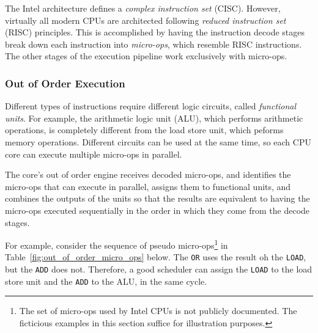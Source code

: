 
The Intel architecture defines a \textit{complex instruction set} (CISC).
However, virtually all modern CPUs are architected following \textit{reduced
instruction set} (RISC) principles. This is accomplished by having the
instruction decode stages break down each instruction into \textit{micro-ops},
which resemble RISC instructions. The other stages of the execution pipeline
work exclusively with micro-ops.


\subsubsection{Out of Order Execution}


Different types of instructions require different logic circuits, called
\textit{functional units}. For example, the arithmetic logic unit (ALU), which
performs arithmetic operations, is completely different from the load store
unit, which peforms memory operations. Different circuits can be used at the
same time, so each CPU core can execute multiple micro-ops in parallel.

The core's out of order engine receives decoded micro-ops, and identifies the
micro-ops that can execute in parallel, assigns them to functional units, and
combines the outputs of the units so that the results are equivalent to having
the micro-ops executed sequentially in the order in which they come from the
decode stages.

For example, consider the sequence of pseudo micro-ops\footnote{The set of
micro-ops used by Intel CPUs is not publicly documented. The ficticious
examples in this section suffice for illustration purposes.} in
Table~\ref{fig:out_of_order_micro_ops} below. The \texttt{OR} uses the result
oh the \texttt{LOAD}, but the \texttt{ADD} does not. Therefore, a good
scheduler can assign the \texttt{LOAD} to the load store unit and the
\texttt{ADD} to the ALU, in the same cycle.

\begin{table}[hbt]
  \caption{
    Pseudo micro-ops for the out of order execution example.
  }
  \label{fig:out_of_order_micro_ops}
\end{table}

